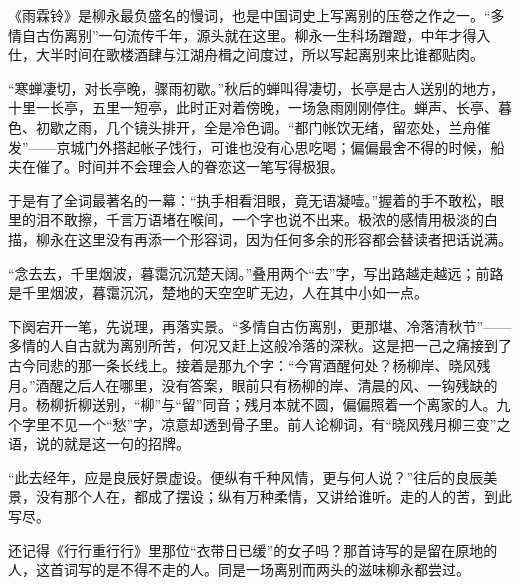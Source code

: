\begin{appreciation}
《雨霖铃》是柳永最负盛名的慢词，也是中国词史上写离别的压卷之作之一。“多情自古伤离别”一句流传千年，源头就在这里。柳永一生科场蹭蹬，中年才得入仕，大半时间在歌楼酒肆与江湖舟楫之间度过，所以写起离别来比谁都贴肉。

“寒蝉凄切，对长亭晚，骤雨初歇。”秋后的蝉叫得凄切，长亭是古人送别的地方，十里一长亭，五里一短亭，此时正对着傍晚，一场急雨刚刚停住。蝉声、长亭、暮色、初歇之雨，几个镜头排开，全是冷色调。“都门帐饮无绪，留恋处，兰舟催发”——京城门外搭起帐子饯行，可谁也没有心思吃喝；偏偏最舍不得的时候，船夫在催了。时间并不会理会人的眷恋这一笔写得极狠。

于是有了全词最著名的一幕：“执手相看泪眼，竟无语凝噎。”握着的手不敢松，眼里的泪不敢擦，千言万语堵在喉间，一个字也说不出来。极浓的感情用极淡的白描，柳永在这里没有再添一个形容词，因为任何多余的形容都会替读者把话说满。

“念去去，千里烟波，暮霭沉沉楚天阔。”叠用两个“去”字，写出路越走越远；前路是千里烟波，暮霭沉沉，楚地的天空空旷无边，人在其中小如一点。

下阕宕开一笔，先说理，再落实景。“多情自古伤离别，更那堪、冷落清秋节”——多情的人自古就为离别所苦，何况又赶上这般冷落的深秋。这是把一己之痛接到了古今同悲的那一条长线上。接着是那九个字：“今宵酒醒何处？杨柳岸、晓风残月。”酒醒之后人在哪里，没有答案，眼前只有杨柳的岸、清晨的风、一钩残缺的月。杨柳折柳送别，“柳”与“留”同音；残月本就不圆，偏偏照着一个离家的人。九个字里不见一个“愁”字，凉意却透到骨子里。前人论柳词，有“晓风残月柳三变”之语，说的就是这一句的招牌。

“此去经年，应是良辰好景虚设。便纵有千种风情，更与何人说？”往后的良辰美景，没有那个人在，都成了摆设；纵有万种柔情，又讲给谁听。走的人的苦，到此写尽。

还记得《行行重行行》里那位“衣带日已缓”的女子吗？那首诗写的是留在原地的人，这首词写的是不得不走的人。同是一场离别而两头的滋味柳永都尝过。
\end{appreciation}

